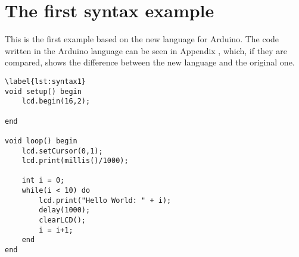 \section{The first syntax example}
This is the first example based on the new language for Arduino. The code written in the Arduino language can be seen in Appendix , which, if they are compared, shows the difference between the new language and the original one.
\begin{lstlisting}
\label{lst:syntax1}
void setup() begin
    lcd.begin(16,2);
    
end

void loop() begin
    lcd.setCursor(0,1);
    lcd.print(millis()/1000);
    
    int i = 0;
    while(i < 10) do
        lcd.print("Hello World: " + i);
        delay(1000);
        clearLCD();
        i = i+1;
    end
end
\end{lstlisting}